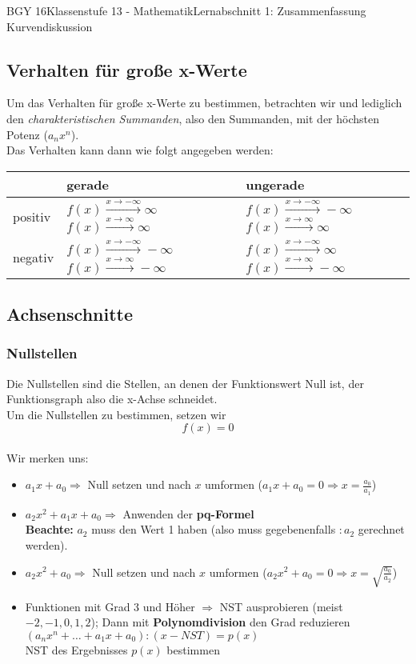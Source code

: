 \documentclass[11pt,twocolumn,oneside,openany,headings=optiontotoc,11pt,numbers=noenddot]{article}
\begin{document}
\begin{worksheet}{BGY 16}{Klassenstufe 13 - Mathematik}{Lernabschnitt 1: Zusammenfassung Kurvendiskussion}
		\subsection{Verhalten für große x-Werte} Um das Verhalten für große x-Werte zu bestimmen, betrachten wir und lediglich den \textit{charakteristischen Summanden}, also den Summanden, mit der höchsten Potenz (\(a_nx^n\)).\\
		Das Verhalten kann dann wie folgt angegeben werden:
		\begin{tabular}{|l|L{0.15\textwidth}|L{0.15\textwidth}|}
			\hline
			 & gerade & ungerade\\
			\hline
			positiv &  & \\
			\hline
			negativ &  & \\
			\hline
		\end{tabular}
		\subsection{Achsenschnitte}
		\subsubsection*{Nullstellen} Die Nullstellen sind die Stellen, an denen der Funktionswert Null ist, der Funktionsgraph also die x-Achse schneidet.\\
		Um die Nullstellen zu bestimmen, setzen wir \[f(x) = 0\]\\
		Wir merken uns:
		\begin{itemize}
			\item \(a_1x + a_0 \Rightarrow\) Null setzen und nach \(x\) umformen (\(a_1x + a_0 = 0 \Rightarrow x = \frac{a_0}{a_1}\))
			\item  \(a_2x^2 + a_1x + a_0 \Rightarrow\) Anwenden der \textbf{pq-Formel}\\
			\textbf{Beachte:} \(a_2\) muss den Wert 1 haben (also muss gegebenenfalls \(:a_2\) gerechnet werden).
			\item \(a_2x^2 + a_0 \Rightarrow\) Null setzen und nach \(x\) umformen (\(a_2x^2 + a_0 = 0 \Rightarrow x = \sqrt{\frac{a_0}{a_2}}\))
			\item Funktionen mit Grad 3 und Höher \(\Rightarrow\) NST ausprobieren (meist \(-2,-1,0,1,2\)); Dann mit \textbf{Polynomdivision} den Grad reduzieren\\
			\((a_nx^n + \ldots +a_1x +a_0):(x-NST) = p(x)\)\\
			NST des Ergebnisses \(p(x)\) bestimmen
		\end{itemize}

\end{worksheet}
\end{document}
